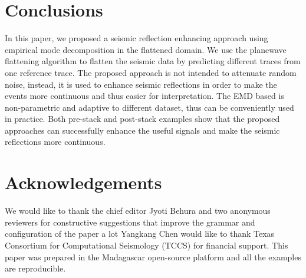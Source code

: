 

 
\section{Conclusions}
In this paper, we proposed a seismic reflection enhancing approach using  empirical mode decomposition  in the flattened domain. We use the plane\new{-}wave flattening algorithm to flatten the seismic data by predicting different traces from one reference trace.  The proposed approach is not intended to attenuate random noise, instead, it is used to enhance seismic reflections in order to make the events more continuous and thus easier for interpretation. The EMD based  is non-parametric and adaptive to different dataset, thus can be conveniently used in practice. Both pre-stack and post-stack examples show that the proposed approaches can successfully enhance the useful signals and make the seismic reflections more continuous. 

\section{Acknowledgements}
We would like to thank the chief editor Jyoti Behura and two anonymous reviewers for  constructive suggestions that improve the grammar and configuration of the paper a lot Yangkang Chen would like to thank Texas Consortium for Computational Seismology (TCCS) for financial support. This paper was prepared in the Madagascar open-source platform \cite[]{mada2013} and all the examples are reproducible.






